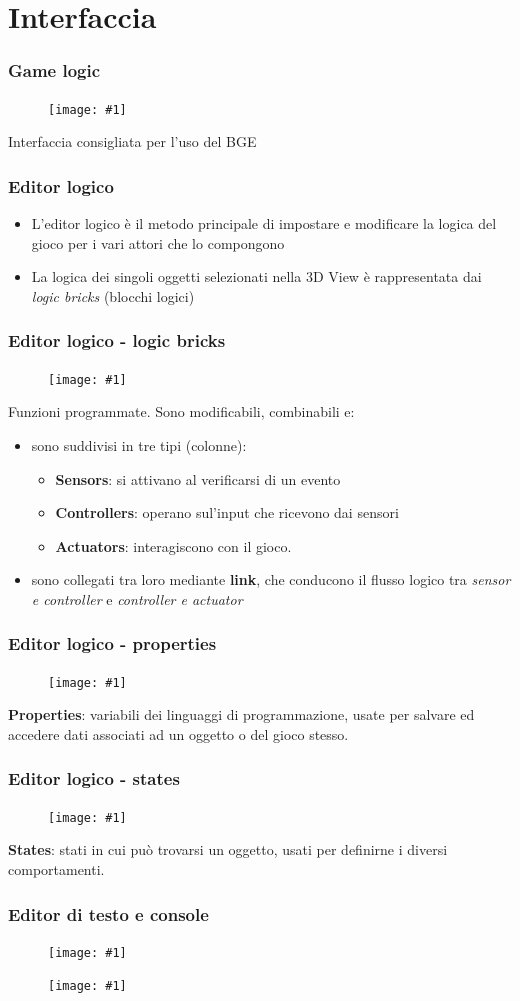 \documentclass{beamer}
\def\image[#1][#2]{
	\begin{figure}[H]
		\centering
		\texttt{[image: \#1]}
\end{figure}}
\begin{document}
	\section{Interfaccia}
		\begin{frame}
			\frametitle{Game logic}
			\image[images/gamegui.png][scale=0.16]
			Interfaccia consigliata per l'uso del BGE
		\end{frame}
		\begin{frame}
			\frametitle{Editor logico}
			\begin{itemize}
				\item L'editor logico è il metodo principale di impostare e modificare la logica del gioco per i vari attori che lo compongono
				\item La logica dei singoli oggetti selezionati nella 3D View è rappresentata dai \textit{logic bricks} (blocchi logici)
			\end{itemize}
		\end{frame}
		\begin{frame}
			\frametitle{Editor logico - logic bricks}
			\image[images/logic_bricks.png][scale=0.20]
			Funzioni programmate. Sono modificabili, combinabili e:
				\begin{itemize}
					\item sono suddivisi in tre tipi (colonne): 
					\begin{itemize}
						\item \textbf{Sensors}: si attivano al verificarsi di un evento
						\item \textbf{Controllers}: operano sul'input che ricevono dai sensori
						\item \textbf{Actuators}: interagiscono con il gioco.
					\end{itemize}
						\item sono collegati tra loro mediante \textbf{link}, che conducono il flusso logico tra \textit{sensor e controller} e \textit{controller e actuator}
					\end{itemize}
		\end{frame}
		\begin{frame}
			\frametitle{Editor logico - properties}
			\image[images/props.png][scale=0.4]
			\textbf{Properties}: variabili dei linguaggi di programmazione, usate per salvare ed accedere dati associati ad un oggetto o del gioco stesso.
		\end{frame}
		\begin{frame}
			\frametitle{Editor logico - states}
			\image[images/states.png][scale=0.3]
			\textbf{States}: stati in cui può trovarsi un oggetto, usati per definirne i diversi comportamenti. %
		\end{frame}
		\begin{frame}
			\frametitle{Editor di testo e console}
			\image[images/editor.png][scale=0.25]
			\image[images/console.png][scale=0.25]
		\end{frame}
	
\end{document}
